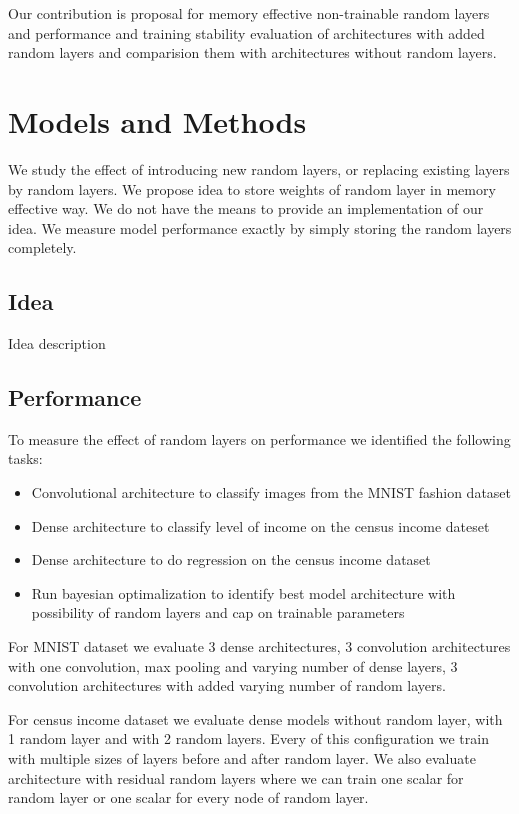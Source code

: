 \documentclass[]{article}
\begin{document}
\begin{multicols}{2}
	Our contribution is proposal for memory effective non-trainable random layers and performance and training stability evaluation of architectures with added random layers and comparision them with architectures without random layers.
	
	\section{Models and Methods}
	We study the effect of introducing new random layers, or replacing existing layers by random layers. We propose idea to store weights of random layer in memory effective way. We do not have the means to provide an implementation of our idea. We measure model performance exactly by simply storing the random layers completely.
	
	\subsection{Idea}
	Idea description
	
	
	\subsection{Performance}
	To measure the effect of random layers on performance we identified the following tasks:
	\begin{itemize}
		\itemsep0em
		\item Convolutional architecture to classify images from the MNIST fashion  dataset
		\item Dense architecture to classify level of income on the census income dateset
		\item Dense architecture to do regression on the census income dataset
		\item Run bayesian optimalization to identify best model architecture with possibility of random layers and cap on trainable parameters
	\end{itemize}
	For MNIST dataset we evaluate 3 dense architectures, 3 convolution architectures with one convolution, max pooling and varying number of dense layers, 3 convolution architectures with added varying number of random layers.

	For census income dataset we evaluate dense models without random layer, with 1 random layer and with 2 random layers. Every of this configuration we train with multiple sizes of layers before and after random layer. We also evaluate architecture with residual random layers where we can train one scalar for random layer or one scalar for every node of random layer.
	

\end{multicols}
\end{document}
